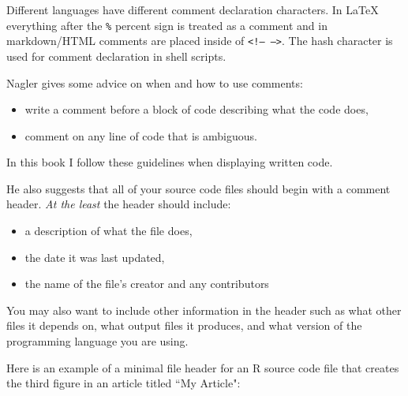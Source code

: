 {Different languages have different comment declaration characters. In LaTeX everything after the {\tt{\%}} percent sign is treated as a comment and in markdown/HTML comments are placed inside of {\tt{\textless !-- --\textgreater}}. The hash character is used for comment declaration in shell scripts.

Nagler \citeyearpar[491]{Nagler1995} gives some advice on when and how to use comments:

\begin{itemize}
    \item write a comment before a block of code describing what the code does,
    \item comment on any line of code that is ambiguous.
\end{itemize}

\noindent In this book I follow these guidelines when displaying written code. 

He also suggests that all of your source code files should begin with a comment header. {\emph{At the least}} the header should include:

\begin{itemize}
    \item a description of what the file does,
    \item the date it was last updated,
    \item the name of the file's creator and any contributors
\end{itemize}

\noindent You may also want to include other information in the header such as what other files it depends on, what output files it produces, and what version of the programming language you are using. 

Here is an example of a minimal file header for an R source code file that creates the third figure in an article titled ``My Article":

\begin{knitrout}
\color{fgcolor}\begin{kframe}
\begin{alltt}
\hlcomment{##################}
\hlcomment{##################}
\end{alltt}
\end{kframe}
\end{knitrout}


}
